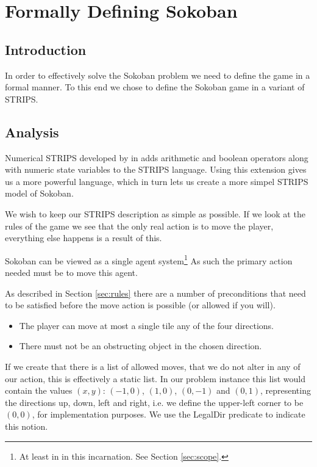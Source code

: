 \chapter{Formally Defining Sokoban}
\label{cha:strips}
\section{Introduction}
In order to effectively solve the Sokoban problem we need to define
the game in a formal manner. To this end we chose to define the
Sokoban game in a variant of STRIPS.



\section{Analysis}
Numerical STRIPS developed by \citet{Hoffmann03themetric-ff} in
\citeyear{Hoffmann03themetric-ff} adds arithmetic and boolean
operators along with numeric state variables to the STRIPS
language. Using this extension gives us a more powerful language,
which in turn lets us create a more simpel STRIPS model of Sokoban.

We wish to keep our STRIPS description as simple as possible. If we
look at the rules of the game we see that the only real action is to
move the player, everything else happens is a result of this.

Sokoban can be viewed as a single agent system\footnote{At least in in
  this incarnation. See Section \ref{sec:scope}.} As such the primary
action needed must be to move this agent.

As described in Section \ref{sec:rules} there are a number of
preconditions that need to be satisfied before the move action is
possible (or allowed if you will).

\begin{itemize}
\item The player can move at most a single tile any of the four
  directions.
\item There must not be an obstructing object in the chosen direction.
\end{itemize}

If we create that there is a list of allowed moves, that we do not
alter in any of our action, this is effectively a static list. In our
problem instance this list would contain the values $(x,y)$: $(-1,0)$,
$(1,0)$, $(0,-1)$ and $(0,1)$, representing the directions up, down,
left and right, i.e. we define the upper-left corner to be $(0,0)$,
for implementation purposes. We use the LegalDir predicate to indicate
this notion.


